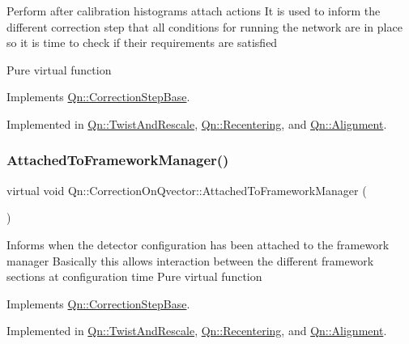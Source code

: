Perform after calibration histograms attach actions It is used to inform the different correction step that all conditions for running the network are in place so it is time to check if their requirements are satisfied

Pure virtual function 

Implements \mbox{\hyperlink{classQn_1_1CorrectionStepBase_a0c32c1fceb1f1be225ef0407a806f9e2}{Qn\+::\+Correction\+Step\+Base}}.



Implemented in \mbox{\hyperlink{classQn_1_1TwistAndRescale_ab9f2ec874c828bc88d70232ae4ca8e63}{Qn\+::\+Twist\+And\+Rescale}}, \mbox{\hyperlink{classQn_1_1Recentering_afce97632b1a2cc9ecf49a4f4768601dc}{Qn\+::\+Recentering}}, and \mbox{\hyperlink{classQn_1_1Alignment_a38007827bb028b2f2e0b4a3fb988d8ed}{Qn\+::\+Alignment}}.

\mbox{\label{classQn_1_1CorrectionOnQvector_ad2d37eb35973c854c7ffa3560a97d510}} 
\subsubsection{\texorpdfstring{Attached\+To\+Framework\+Manager()}{AttachedToFrameworkManager()}}
{\footnotesize\ttfamily virtual void Qn\+::\+Correction\+On\+Qvector\+::\+Attached\+To\+Framework\+Manager (\begin{DoxyParamCaption}{ }\end{DoxyParamCaption})\hspace{0.3cm}{\ttfamily [pure virtual]}}

Informs when the detector configuration has been attached to the framework manager Basically this allows interaction between the different framework sections at configuration time Pure virtual function 

Implements \mbox{\hyperlink{classQn_1_1CorrectionStepBase_a0c255ad7095cd2aa89fcf1f1db068949}{Qn\+::\+Correction\+Step\+Base}}.



Implemented in \mbox{\hyperlink{classQn_1_1TwistAndRescale_a75b3e7001fabda74adcf1441ffab1435}{Qn\+::\+Twist\+And\+Rescale}}, \mbox{\hyperlink{classQn_1_1Recentering_aa51bf50f4a003ac79e7d8c669b1efdac}{Qn\+::\+Recentering}}, and \mbox{\hyperlink{classQn_1_1Alignment_ad9791cc06c9a7d8c407e1f783c7625f8}{Qn\+::\+Alignment}}.

